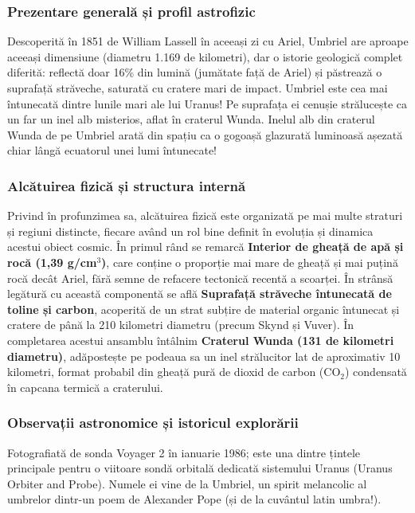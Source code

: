 \subsubsection*{Prezentare generală și profil astrofizic}
Descoperită în 1851 de William Lassell în aceeași zi cu Ariel, Umbriel are aproape aceeași dimensiune (diametru 1.169 de kilometri), dar o istorie geologică complet diferită: reflectă doar 16\% din lumină (jumătate față de Ariel) și păstrează o suprafață străveche, saturată cu cratere mari de impact. Umbriel este cea mai întunecată dintre lunile mari ale lui Uranus! Pe suprafața ei cenușie strălucește ca un far un inel alb misterios, aflat în craterul Wunda. Inelul alb din craterul Wunda de pe Umbriel arată din spațiu ca o gogoașă glazurată luminoasă așezată chiar lângă ecuatorul unei lumi întunecate!

\subsubsection*{Alcătuirea fizică și structura internă}
Privind în profunzimea sa, alcătuirea fizică este organizată pe mai multe straturi și regiuni distincte, fiecare având un rol bine definit în evoluția și dinamica acestui obiect cosmic. În primul rând se remarcă \textbf{Interior de gheață de apă și rocă (1,39 g/cm$^3$)}, care conține o proporție mai mare de gheață și mai puțină rocă decât Ariel, fără semne de refacere tectonică recentă a scoarței. În strânsă legătură cu această componentă se află \textbf{Suprafață străveche întunecată de toline și carbon}, acoperită de un strat subțire de material organic întunecat și cratere de până la 210 kilometri diametru (precum Skynd și Vuver). În completarea acestui ansamblu întâlnim \textbf{Craterul Wunda (131 de kilometri diametru)}, adăpostește pe podeaua sa un inel strălucitor lat de aproximativ 10 kilometri, format probabil din gheață pură de dioxid de carbon (CO$_2$) condensată în capcana termică a craterului.

\subsubsection*{Observații astronomice și istoricul explorării}
Fotografiată de sonda Voyager 2 în ianuarie 1986; este una dintre țintele principale pentru o viitoare sondă orbitală dedicată sistemului Uranus (Uranus Orbiter and Probe). Numele ei vine de la \guillemotleft{}Umbriel\guillemotright{}, un spirit melancolic al umbrelor dintr-un poem de Alexander Pope (și de la cuvântul latin \guillemotleft{}umbra\guillemotright{}!).


